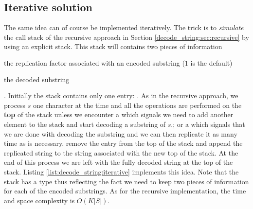  \subsection{Iterative solution}
 \label{decode_string:sec:iterative}
The same idea can of course be implemented iteratively. The trick is to \textit{simulate} the call
stack of the recursive approach in Section \ref{decode_string:sec:recursive} by using an explicit
stack. This stack will contains two pieces of information 
\begin{enumerate*}
	\item the replication factor associated with an encoded substring ($1$ is the default)
	\item the decoded substring \end{enumerate*}. Initially the stack contains only one entry: 
	. 
	As in the recursive approach, we process $s$ one character  at the time and all the
operations are performed on the \textbf{top} of the stack unless we encounter a \inline{'['} which
signals we need to add another element to the stack and start decoding a substring of $s$.; or a
\inline{']'} which signals that we are done with decoding the substring and we can then replicate it
as many time as is necessary, remove the entry from the top of the stack and append the replicated
string to the string associated with the new top of the stack. At the end of this process we are
left with the fully decoded string at the top of the stack. Listing
\ref{list:decode_string:iterative} implements this idea. Note that the stack has a type
 thus reflecting the fact we need to keep two pieces of 
information for each of the encoded substrings.
As for the recursive implementation, the time and space complexity is $O(K|S|)$.

